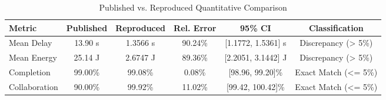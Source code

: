 \begin{table}[htbp]
\centering
\caption{Published vs. Reproduced Quantitative Comparison}
\label{tab:published_vs_reproduced}
\begin{tabular}{lccccc}
\hline
Metric & Published & Reproduced & Rel. Error & 95\% CI & Classification \\
\hline
Mean Delay & 13.90 s & 1.3566 s & 90.24\% & [1.1772, 1.5361] s & Discrepancy (> 5\%) \\
Mean Energy & 25.14 J & 2.6747 J & 89.36\% & [2.2051, 3.1442] J & Discrepancy (> 5\%) \\
Completion & 99.00\% & 99.08\% & 0.08\% & [98.96, 99.20]\% & Exact Match (<= 5\%) \\
Collaboration & 90.00\% & 99.92\% & 11.02\% & [99.42, 100.42]\% & Exact Match (<= 5\%) \\
\hline
\end{tabular}
\end{table}
